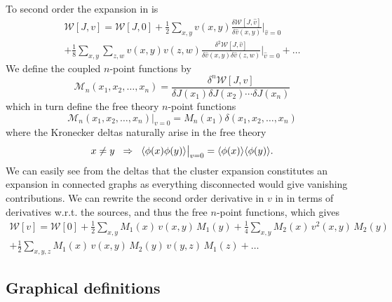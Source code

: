 %
To second order the expansion in  is
%
\begin{multline} \label{eq:linked_cluster_2nd_order}
  \mathcal{W}[J, v] = \mathcal{W}[J,0]
    + \frac{1}{2} \sum_{x,y} v(x,y) \frac{\delta \mathcal{W}[J,\hat{v}]}{\delta \hat{v}(x,y)} \bigg|_{\hat{v}=0} \\
    + \frac{1}{8} \sum_{x,y} \sum_{z,w} v(x,y) v(z,w) \frac{\delta^2
      \mathcal{W}[J,\hat{v}]}{\delta \hat{v}(x,y) \delta \hat{v}(z,w)}
    \bigg|_{\hat{v}=0} + \dots
\end{multline}
%
We define the coupled $n$-point functions by
%
\begin{equation}
  \mathcal{M}_n(x_1, x_2, \dots, x_n) = \frac{\delta^n \mathcal{W}[J,v]}{\delta
    J(x_1) \delta J(x_2) \cdots \delta J(x_n)}
\end{equation}
%
which in turn define the free theory $n$-point functions
%
\begin{equation}
   \mathcal{M}_n(x_1, x_2, \dots, x_n) \big|_{v = 0}
   = M_n(x_1) \delta(x_1, x_2, \dots, x_n)
\end{equation}
%
where the Kronecker deltas naturally arise in the free theory
%
\begin{equation}
  x \neq y \hskip .2cm\Rightarrow\hskip .2cm
    \langle \phi(x) \phi(y) \rangle \big|_{v=0} = \langle \phi(x) \rangle \langle \phi(y)
    \rangle.
\end{equation}
%
We can easily see from the deltas that the cluster expansion constitutes an
expansion in connected graphs as everything disconnected would give vanishing
contributions. We can rewrite the second order derivative in $v$ in 
 in terms of derivatives w.r.t. the sources,
and thus the free $n$-point functions, which gives
%
\begin{multline} \label{eq:free_energy_before_graph}
  \mathcal{W}[v] = \mathcal{W}[0] + \frac{1}{2} \sum_{x,y} M_1(x) \,v(x,y)\, M_1(y)
  + \frac{1}{4} \sum_{x,y} M_2(x) \,v^2(x,y)\, M_2(y)\\+ \frac{1}{2} \sum_{x,y,z}
  M_1(x) \,v(x,y)\, M_2(y) \,v(y,z)\, M_1(z) + \dots
\end{multline}

\subsection{Graphical definitions}

